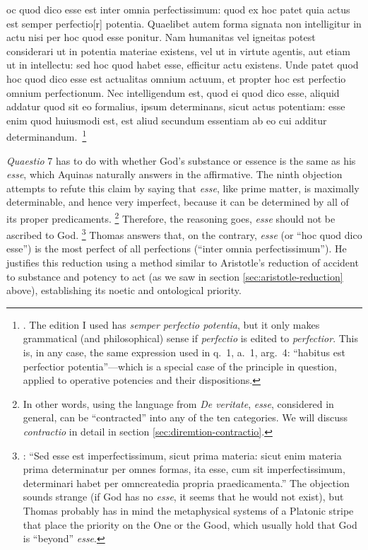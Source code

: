 \begin{greekQuotation}
[H]oc quod dico esse est inter omnia perfectissimum: quod ex hoc patet quia actus est semper perfectio[r] potentia. Quaelibet autem forma signata non intelligitur in actu nisi per hoc quod esse ponitur. Nam humanitas vel igneitas potest considerari ut in potentia materiae existens, vel ut in virtute agentis, aut etiam ut in intellectu: sed hoc quod habet esse, efficitur actu existens. Unde patet quod hoc quod dico esse est actualitas omnium actuum, et propter hoc est perfectio omnium perfectionum. Nec intelligendum est, quod ei quod dico esse, aliquid addatur quod sit eo formalius, ipsum determinans, sicut actus potentiam: esse enim quod huiusmodi est, est aliud secundum essentiam ab eo cui additur determinandum.\,%
%
\footnote{\Cite[q.~7, a.~2 ad~9]{st:depotentia}. The edition I used has \emph{semper perfectio potentia}, but it only makes grammatical (and philosophical) sense if \emph{perfectio} is edited to \emph{perfectior}. This is, in any case, the same expression used in q.~1, a.~1, arg.~4: ``habitus est perfectior potentia''---which is a special case of the principle in question, applied to operative potencies and their dispositions.}
\end{greekQuotation}
%
\emph{Quaestio} 7 has to do with whether God's substance or essence is the same as his \emph{esse}, which Aquinas naturally answers in the affirmative. The ninth objection attempts to refute this claim by saying that \emph{esse}, like prime matter, is maximally determinable, and hence very imperfect, because it can be determined by all of its proper predicaments.%
\footnote{In other words, using the language from \emph{De veritate}, \emph{esse}, considered in general, can be ``contracted'' into any of the ten categories. We will discuss \emph{contractio} in detail in section \ref{sec:diremtion-contractio}.}
%
Therefore, the reasoning goes, \emph{esse} should not be ascribed to God.%
%
\footnote{\Cite[See][q.~7, a.~2 ad~9]{st:depotentia}: ``Sed esse est imperfectissimum, sicut prima materia: sicut enim materia prima determinatur per omnes formas, ita esse, cum sit imperfectissimum, determinari habet per omncreatedia propria praedicamenta.'' The objection sounds strange (if God has no \emph{esse}, it seems that he would not exist), but Thomas probably has in mind the metaphysical systems of a Platonic stripe that place the priority on the One or the Good, which usually hold that  God is ``beyond'' \emph{esse}.} Thomas answers that, on the contrary, \emph{esse} (or ``hoc quod dico esse'') is the most perfect of all perfections (``inter omnia perfectissimum''). He justifies this reduction using a method similar to Aristotle's reduction of accident to substance and potency to act (as we saw in section \ref{sec:aristotle-reduction} above), establishing its noetic and ontological priority.%
